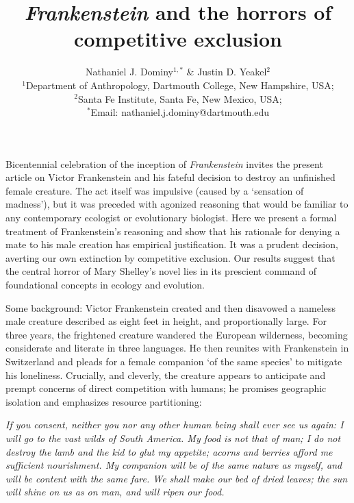 \documentclass{article}[10pt]
\begin{document}
\title{\emph{Frankenstein} and the horrors of competitive exclusion}


\author{Nathaniel J. Dominy${}^{1,*}$ \& Justin D. Yeakel${}^2$\\
\small{${}^1$Department of Anthropology, Dartmouth College, New Hampshire, USA;}\\
\small{${}^2$Santa Fe Institute, Santa Fe, New Mexico, USA;}\\
\small{${}^*$Email: nathaniel.j.dominy@dartmouth.edu}}

\date{}
%
%


\maketitle
\vspace{-1cm}

Bicentennial celebration of the inception of \textit{Frankenstein} invites the present article on Victor Frankenstein and his fateful decision to destroy an unfinished female creature. 
The act itself was impulsive (caused by a `sensation of madness'), but it was preceded with agonized reasoning that would be familiar to any contemporary ecologist or evolutionary biologist. 
Here we present a formal treatment of Frankenstein's reasoning and show that his rationale for denying a mate to his male creation has empirical justification.
It was a prudent decision, averting our own extinction by competitive exclusion. 
Our results suggest that the central horror of Mary Shelley's novel lies in its prescient command of foundational concepts in ecology and evolution.



Some background: Victor Frankenstein created and then disavowed a nameless male creature described as eight feet in height, and proportionally large. 
For three years, the frightened creature wandered the European wilderness, becoming considerate and literate in three languages. 
He then reunites with Frankenstein in Switzerland and pleads for a female companion `of the same species' to mitigate his loneliness. Crucially, and cleverly, the creature appears to anticipate and prempt concerns of direct competition with humans; he promises geographic isolation and emphasizes resource partitioning:


\begin{displayquote}
\emph{If you consent, neither you nor any other human being shall ever see us again: I will go to the vast wilds of South America. My food is not that of man; I do not destroy the lamb and the kid to glut my appetite; acorns and berries afford me sufficient nourishment. My companion will be of the same nature as myself, and will be content with the same fare. We shall make our bed of dried leaves; the sun will shine on us as on man, and will ripen our food.}
\end{displayquote}
\end{document}
